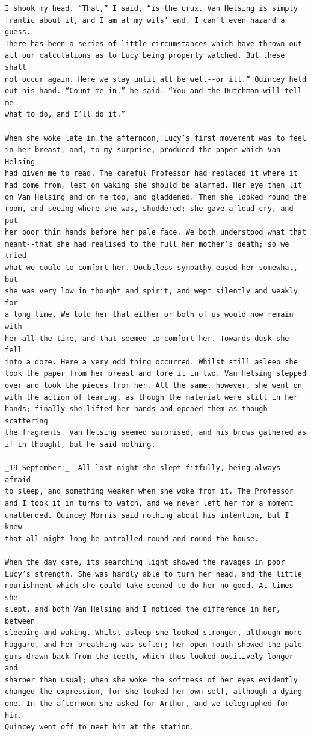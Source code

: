 \documentclass{article}
\begin{document}
\begin{verbatim}
I shook my head. “That,” I said, “is the crux. Van Helsing is simply
frantic about it, and I am at my wits’ end. I can’t even hazard a guess.
There has been a series of little circumstances which have thrown out
all our calculations as to Lucy being properly watched. But these shall
not occur again. Here we stay until all be well--or ill.” Quincey held
out his hand. “Count me in,” he said. “You and the Dutchman will tell me
what to do, and I’ll do it.”

When she woke late in the afternoon, Lucy’s first movement was to feel
in her breast, and, to my surprise, produced the paper which Van Helsing
had given me to read. The careful Professor had replaced it where it
had come from, lest on waking she should be alarmed. Her eye then lit
on Van Helsing and on me too, and gladdened. Then she looked round the
room, and seeing where she was, shuddered; she gave a loud cry, and put
her poor thin hands before her pale face. We both understood what that
meant--that she had realised to the full her mother’s death; so we tried
what we could to comfort her. Doubtless sympathy eased her somewhat, but
she was very low in thought and spirit, and wept silently and weakly for
a long time. We told her that either or both of us would now remain with
her all the time, and that seemed to comfort her. Towards dusk she fell
into a doze. Here a very odd thing occurred. Whilst still asleep she
took the paper from her breast and tore it in two. Van Helsing stepped
over and took the pieces from her. All the same, however, she went on
with the action of tearing, as though the material were still in her
hands; finally she lifted her hands and opened them as though scattering
the fragments. Van Helsing seemed surprised, and his brows gathered as
if in thought, but he said nothing.

_19 September._--All last night she slept fitfully, being always afraid
to sleep, and something weaker when she woke from it. The Professor
and I took it in turns to watch, and we never left her for a moment
unattended. Quincey Morris said nothing about his intention, but I knew
that all night long he patrolled round and round the house.

When the day came, its searching light showed the ravages in poor
Lucy’s strength. She was hardly able to turn her head, and the little
nourishment which she could take seemed to do her no good. At times she
slept, and both Van Helsing and I noticed the difference in her, between
sleeping and waking. Whilst asleep she looked stronger, although more
haggard, and her breathing was softer; her open mouth showed the pale
gums drawn back from the teeth, which thus looked positively longer and
sharper than usual; when she woke the softness of her eyes evidently
changed the expression, for she looked her own self, although a dying
one. In the afternoon she asked for Arthur, and we telegraphed for him.
Quincey went off to meet him at the station.


\end{verbatim}
\end{document}
